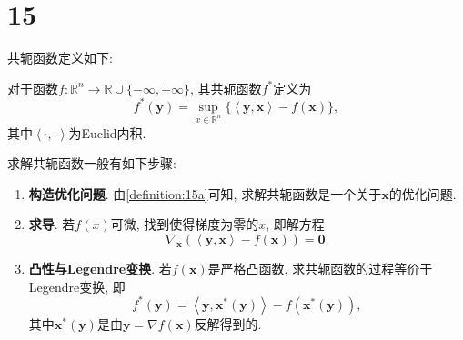 \section*{15}

共轭函数定义如下:
\begin{definition}
    \label{definition:15a}
    对于函数$f:\mathbb{R}^n\to\mathbb{R}\cup\{-\infty,+\infty\}$, 其共轭函数$f^*$定义为
    \begin{equation*}
        f^*(\bm{y})=\sup_{x\in\mathbb{R}^n}\{\left<\bm{y},\bm{x}\right>-f(\bm{x})\},
    \end{equation*}
    其中$\left<\cdot,\cdot\right>$为Euclid内积.
\end{definition}

求解共轭函数一般有如下步骤:
\begin{enumerate}
    \item \textbf{构造优化问题}.
        由\cref{definition:15a}可知, 求解共轭函数是一个关于$\bm{x}$的优化问题.

    \item \textbf{求导}.
        若$f(x)$可微, 找到使得梯度为零的$x$, 即解方程
        \begin{equation*}
            \nabla_{\bm{x}}(\left<\bm{y},\bm{x}\right>-f(\bm{x}))=\bm{0}.
        \end{equation*}
    
    \item \textbf{凸性与Legendre变换}.
        若$f(\bm{x})$是严格凸函数, 求共轭函数的过程等价于Legendre变换, 即
        \begin{equation*}
            f^*(\bm{y})=\left<\bm{y},\bm{x}^*(\bm{y})\right>-f(\bm{x}^*(\bm{y})),
        \end{equation*}
        其中$\bm{x}^*(\bm{y})$是由$\bm{y}=\nabla f(\bm{x})$反解得到的.
\end{enumerate}

